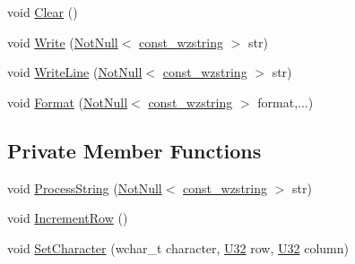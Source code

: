 \begin{DoxyCompactItemize}
\item 
void \hyperlink{classmage_1_1script_1_1_text_console_script_a274764deea9f02ec77515680456548d6}{Clear} ()
\item 
void \hyperlink{classmage_1_1script_1_1_text_console_script_a46610edcf7a1707476b87ad64f1ee68d}{Write} (\hyperlink{namespacemage_a8769f9d670d6b585ea306cb1062af94b}{Not\+Null}$<$ \hyperlink{namespacemage_ac409e0f2a22292a3a4cd42742994fbf0}{const\+\_\+wzstring} $>$ str)
\item 
void \hyperlink{classmage_1_1script_1_1_text_console_script_ac8f0361bc1d703b56f1d8be43a32f0ae}{Write\+Line} (\hyperlink{namespacemage_a8769f9d670d6b585ea306cb1062af94b}{Not\+Null}$<$ \hyperlink{namespacemage_ac409e0f2a22292a3a4cd42742994fbf0}{const\+\_\+wzstring} $>$ str)
\item 
void \hyperlink{classmage_1_1script_1_1_text_console_script_a6de4d411f60dd62c507c6380ac987030}{Format} (\hyperlink{namespacemage_a8769f9d670d6b585ea306cb1062af94b}{Not\+Null}$<$ \hyperlink{namespacemage_ac409e0f2a22292a3a4cd42742994fbf0}{const\+\_\+wzstring} $>$ format,...)
\end{DoxyCompactItemize}
\subsection*{Private Member Functions}
\begin{DoxyCompactItemize}
\item 
void \hyperlink{classmage_1_1script_1_1_text_console_script_a9c990e0256f01eb4cc1622bf346f32a5}{Process\+String} (\hyperlink{namespacemage_a8769f9d670d6b585ea306cb1062af94b}{Not\+Null}$<$ \hyperlink{namespacemage_ac409e0f2a22292a3a4cd42742994fbf0}{const\+\_\+wzstring} $>$ str)
\item 
void \hyperlink{classmage_1_1script_1_1_text_console_script_a3d4cba4fd8a2733933a7a444c6beaf1a}{Increment\+Row} ()
\item 
void \hyperlink{classmage_1_1script_1_1_text_console_script_a18bdee79ee6f53e28f90b607c36c8188}{Set\+Character} (wchar\+\_\+t character, \hyperlink{namespacemage_a41c104c036fba3756a74e19f793eeaa1}{U32} row, \hyperlink{namespacemage_a41c104c036fba3756a74e19f793eeaa1}{U32} column)
\end{DoxyCompactItemize}
